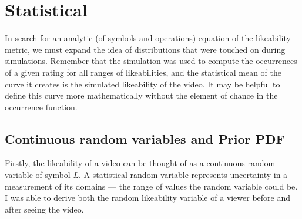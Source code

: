 \documentclass[a4paper,11pt]{article}
\begin{document}
\section{Statistical}

In search for an analytic (of symbols and operations) equation of the likeability metric, we must expand the idea of distributions that were touched on during simulations. Remember that the simulation was used to compute the occurrences of a given rating for all ranges of likeabilities, and the statistical mean of the curve it creates is the simulated likeability of the video. It may be helpful to define this curve more mathematically without the element of chance in the occurrence function.

\subsection{Continuous random variables and Prior PDF}
Firstly, the likeability of a video can be thought of as a continuous random variable of symbol $L$. A statistical random variable represents uncertainty in a measurement of its domains --- the range of values the random variable could be. I was able to derive both the random likeability variable of a viewer before and after seeing the video.




\end{document}
